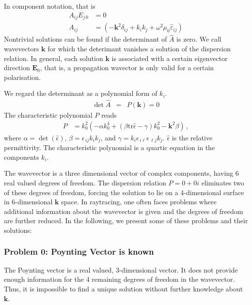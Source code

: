 \documentclass[12pt,a4paper,twoside,openright,BCOR10mm,headsepline,titlepage,abstracton,chapterprefix,final]{scrreprt}
\newcommand\Vector[1]{{\mathbf{#1}}}
\newcommand\vacuum{0}
\newcommand\wavenumber{k}
\newcommand\Wavevector{\Vector{\wavenumber}}
\newcommand\Tensor[1]{\hat{#1}}
\newcommand\scalarEfield{E}
\newcommand\Efield{\Vector{\scalarEfield}}
\newcommand\vacuumpermeability{\scalarpermeability_{\vacuum}}
\newcommand\scalarpermeability{\mu}
\newcommand\permittivity{\Tensor{\scalarpermittivity}}
\newcommand\scalarrelativepermittivity{\epsilon}
\newcommand\relativepermittivity{\Tensor{\scalarrelativepermittivity}}
\newcommand\scalarpermittivity{\varepsilon}
\newcommand\tr{\text{tr}}
\begin{document}
In component notation, that is
\begin{align}
 A_{ij} E_{j\,0} &= 0 \label{eq:generalDispersionEigenEquationindex}\\
 A_{ij}          &= \left(-\Vector{k}^2 \delta_{ij} + k_i k_j + \omega^2 \vacuumpermeability \permittivity_{ij} \right)
 \end{align}
Nontrivial solutions can be found if the determinant of $\hat{A}$ is zero.
We call wavevectors $\Wavevector$ for which the deterimant vanishes a solution of the dispersion relation.
In general, each solution $\Wavevector$ is associated with a certain eigenvector direction $\Efield_0$,
that is, a propagation wavector is only valid for a certain polarisation.

We regard the determinant as a polynomial form of $\wavenumber_i$.
\begin{eqnarray}
 \det \hat{A} &=& P(\Wavevector) = 0
\end{eqnarray}
The characteristic polynomial $P$ reads
\begin{align}
 P &= k_0^2 \left( -\alpha k_0^4 +  (\beta \tr\relativepermittivity - \gamma) k_0^2 - \Vector{k}^2 \beta \right)\,,\label{eq:dispersion_determinant_invariant}
\end{align}
where 
$\alpha = \det(\relativepermittivity)$,
$\beta = \scalarrelativepermittivity_{\,ij} k_i k_j$, 
and
$\gamma = k_i \scalarrelativepermittivity_{\,i\ell} \scalarrelativepermittivity_{\,\ell j} k_j$.
$\relativepermittivity$ is the  relative permittivity.
The characteristic polynomial is a quartic equation in the components $\wavenumber_i$.

The wavevector is a three dimensional vector of complex components, having 6 real valued degrees of freedom.
The dispersion relation $P=0+0i$ eliminates two of these degrees of freedom,
forcing the solution to lie on a 4-dimensional surface in 6-dimensional $\Wavevector$ space.
In raytracing, one often faces problems where additional information about the wavevector is given and the
degrees of freedom are further reduced. In the following, we present some of these problems and their solutions:

\subsubsection{Problem 0: Poynting Vector is known}
The Poynting vector is a real valued, 3-dimensional vector.
It does not provide enough information for the 4 remaining degrees of freedom in the wavevector.
Thus, it is impossible to find a unique solution without further knowledge about $\Wavevector$.
\end{document}

